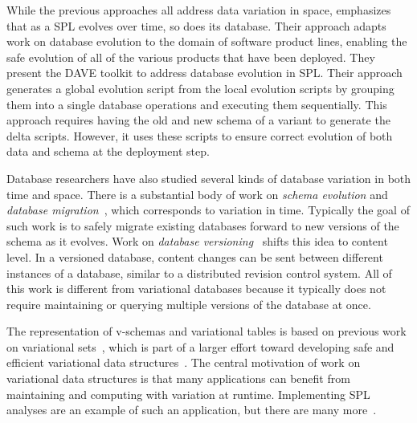 While the previous approaches all address data variation in space, 
\citet{dbSPLevolve} emphasizes that as a SPL evolves over time, so does its
database. Their approach adapts work on database evolution to the
domain of software product lines, enabling the safe evolution of all of the
various products that have been deployed.
%
 They present the DAVE toolkit to address database evolution in SPL. Their
 approach generates a global evolution script from the local evolution scripts
 by grouping them into a single database operations and executing them
 sequentially. This approach requires having the old and new schema of a
 variant to generate the delta scripts. However, it uses these scripts to
 ensure correct evolution of both data and schema at the deployment step. 


Database researchers have also studied several kinds of database variation in
both time and space. There is a substantial body of work on \emph{schema
evolution} and \emph{database
migration}~\cite{Prism08Curino,prima08Moon,schEvolUnifyApp,schEvolIssues03Ram},
which corresponds to variation in time. Typically the goal of such work is to
safely migrate existing databases forward to new versions of the schema as it
evolves. 
%
Work on \emph{database versioning}~\cite{datasetVersioning,dbVersioning}
shifts this idea to content level. In a versioned database, 
content changes can be sent between different instances of a database,
similar to a distributed revision control system.
%
All of this work is different from variational databases because it typically
does not require maintaining or querying multiple versions of the database at
once.
%


The representation of v-schemas and variational tables is based on
previous work on variational sets~\cite{EWC13fosd}, which is part of a larger
effort toward developing safe and efficient variational data
structures~\cite{Walk14onward,MMWWK17vamos}. The central motivation of work on
variational data structures is that many applications can benefit from
maintaining and computing with variation at runtime. Implementing SPL analyses
are an example of such an application, but there are many
more~\cite{Walk14onward}.
%


